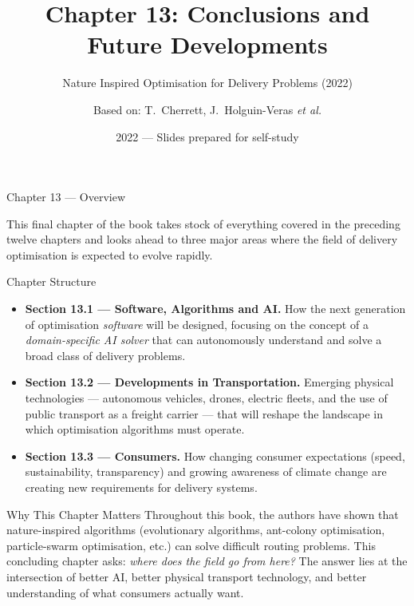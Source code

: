 \documentclass[aspectratio=169,10pt]{beamer}
\title[Ch.~13 Conclusions]{Chapter 13: Conclusions and Future Developments}
\subtitle{Nature Inspired Optimisation for Delivery Problems (2022)}
\author{Based on: T.~Cherrett, J.~Holguin-Veras \textit{et al.}}
\date{2022 --- Slides prepared for self-study}
\begin{document}

\begin{frame}
  \titlepage
\end{frame}

\begin{frame}[allowframebreaks]{Chapter 13 --- Overview}

  This final chapter of the book takes stock of everything covered in the
  preceding twelve chapters and looks ahead to three major areas where the
  field of delivery optimisation is expected to evolve rapidly.

  \bigskip
  \begin{block}{Chapter Structure}
    \begin{itemize}
      \item \textbf{Section 13.1 --- Software, Algorithms and AI.}
            How the next generation of optimisation \emph{software} will be
            designed, focusing on the concept of a \emph{domain-specific AI
            solver} that can autonomously understand and solve a broad class
            of delivery problems.
      \item \textbf{Section 13.2 --- Developments in Transportation.}
            Emerging physical technologies --- autonomous vehicles, drones,
            electric fleets, and the use of public transport as a freight
            carrier --- that will reshape the landscape in which
            optimisation algorithms must operate.
      \item \textbf{Section 13.3 --- Consumers.}
            How changing consumer expectations (speed, sustainability,
            transparency) and growing awareness of climate change are
            creating new requirements for delivery systems.
    \end{itemize}
  \end{block}

  \bigskip
  \begin{alertblock}{Why This Chapter Matters}
    Throughout this book, the authors have shown that nature-inspired
    algorithms (evolutionary algorithms, ant-colony optimisation,
    particle-swarm optimisation, etc.) can solve difficult routing problems.
    This concluding chapter asks: \emph{where does the field go from here?}
    The answer lies at the intersection of better AI, better physical
    transport technology, and better understanding of what consumers
    actually want.
  \end{alertblock}

\end{frame}
\end{document}
